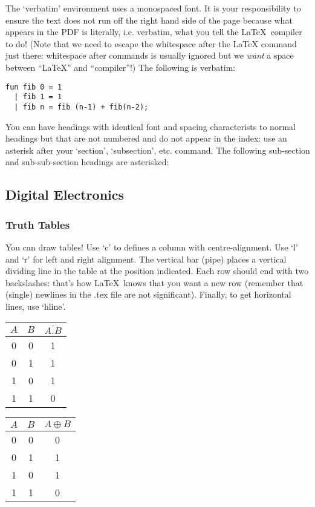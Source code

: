\documentclass[10pt,\jkfside,a4paper]{article}
\begin{document}
The `verbatim' environment uses a monospaced font.  It is your responsibility to ensure the text does not run off the right hand side of the page because what appears in the PDF is literally, i.e. verbatim, what you tell the \LaTeX\ compiler to do! (Note that we need to escape the whitespace after the LaTeX command just there: whitespace after commands is usually ignored but we {\em want} a space between ``\LaTeX'' and ``compiler''!)  The following is verbatim:

\begin{verbatim}
fun fib 0 = 1
  | fib 1 = 1
  | fib n = fib (n-1) + fib(n-2);
\end{verbatim}

You can have headings with identical font and spacing characterists to normal headings but that are not numbered and do not appear in the index: use an asterisk after your `section', `subsection', etc. command.  The following sub-section and sub-sub-section headings are asterisked:

\subsection*{Digital Electronics}
\subsubsection*{Truth Tables}

You can draw tables!  Use `c' to defines a column with centre-alignment.  Use `l' and `r' for left and right alignment.  The vertical bar (pipe) places a vertical dividing line in the table at the position indicated.  Each row should end with two backslashes: that's how \LaTeX\ knows that you want a new row (remember that (single) newlines in the .tex file are not significant).  Finally, to get horizontal lines, use `hline'.

\begin{tabular}{cc|c}
$A$ & $B$ & $\overline{A.B}$\\
\hline
0   & 0   & 1\\
0   & 1   & 1\\
1   & 0   & 1\\
1   & 1   & 0\\
\end{tabular}

\begin{tabular}{cc|c}
$A$ & $B$ & $A\oplus B$\\
\hline
0   & 0   & 0\\
0   & 1   & 1\\
1   & 0   & 1\\
1   & 1   & 0\\
\end{tabular}
\end{document}
